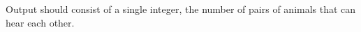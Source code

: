 Output should consist of a single integer, the number of pairs of animals that can hear each other.

